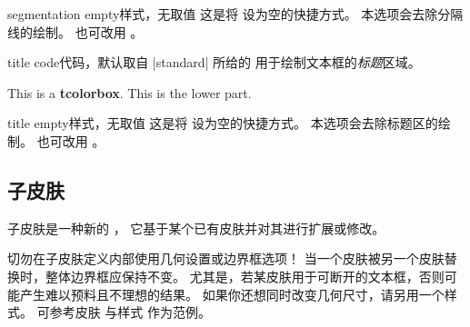 \begin{docTcbKey}{segmentation empty}{}{样式，无取值}
  这是将  设为空的快捷方式。
  本选项会去除分隔线的绘制。
  也可改用 。
\end{docTcbKey}



\clearpage
\begin{docTcbKey}{title code}{}{代码，默认取自 |standard|}
  所给的  用于绘制文本框的\emph{标题}区域。
\begin{dispExample}

\begin{tcolorbox}[enhanced,title=My title,title code={
  \path[draw=yellow,solid,decorate,line width=2mm,
    decoration={coil,aspect=0,segment length=10.1mm}]
    ([xshift=1mm]title.west) -- ([xshift=-1mm]title.east);}]
This is a \textbf{tcolorbox}.
\tcblower
This is the lower part.
\end{tcolorbox}
\end{dispExample}
\end{docTcbKey}


\begin{docTcbKey}{title empty}{}{样式，无取值}
  这是将  设为空的快捷方式。
  本选项会去除标题区的绘制。
  也可改用 。
\end{docTcbKey}

\clearpage
\subsection{子皮肤}\label{subsec:subskins}
子皮肤是一种新的 ，
它基于某个已有皮肤并对其进行扩展或修改。

\begin{marker}
切勿在子皮肤定义内部使用几何设置或边界框选项！
当一个皮肤被另一个皮肤替换时，整体边界框应保持不变。
尤其是，若某皮肤用于可断开的文本框，否则可能产生难以预料且不理想的结果。
如果你还想同时改变几何尺寸，请另用一个样式。
可参考皮肤  与样式  作为范例。
\end{marker}

